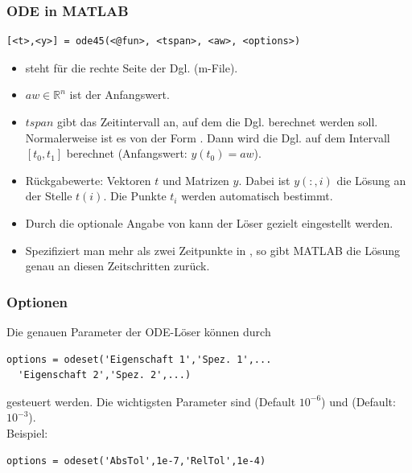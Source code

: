 \documentclass[hyperref={xetex}]{beamer}
\begin{document}
%
%
\begin{frame}[fragile]\frametitle{ODE in MATLAB} 
\begin{lstlisting}
[<t>,<y>] = ode45(<@fun>, <tspan>, <aw>, <options>)
\end{lstlisting}
\begin{itemize}
\item {} steht f\"ur die rechte Seite der Dgl. (m-File).
\item $aw \in \mathbb{R}^n$ ist der Anfangswert.
\item $tspan$ gibt das Zeitintervall an, auf dem die Dgl. berechnet
  werden soll. Normalerweise ist es von der Form
  . Dann wird die Dgl. auf dem Intervall $[t_0,
  t_1]$ berechnet (Anfangswert: $y(t_0)=aw$).
\item Rückgabewerte: Vektoren $t$ und Matrizen $y$. Dabei ist
  $y(:,i)$ die L\"osung an der Stelle $t(i)$. Die Punkte $t_i$ werden
  automatisch bestimmt.
\item Durch die optionale Angabe von  kann der L\"oser
  gezielt eingestellt werden. 
\item Spezifiziert man mehr als zwei Zeitpunkte in , so gibt MATLAB die
  L\"osung genau an diesen Zeitschritten zur\"uck.
\end{itemize}
\end{frame}
%
%
\begin{frame}[fragile]\frametitle{Optionen}
Die genauen Parameter der ODE-L\"oser k\"onnen durch\\

\begin{lstlisting}
options = odeset('Eigenschaft 1','Spez. 1',...
  'Eigenschaft 2','Spez. 2',...) 
\end{lstlisting}

gesteuert werden. Die wichtigsten Parameter sind 
(Default $10^{-6}$) und  (Default: $10^{-3}$). \\[0.5cm]
\alert{Beispiel:}
\begin{lstlisting}
options = odeset('AbsTol',1e-7,'RelTol',1e-4)
\end{lstlisting}
\end{frame}
%
%
\end{document}
